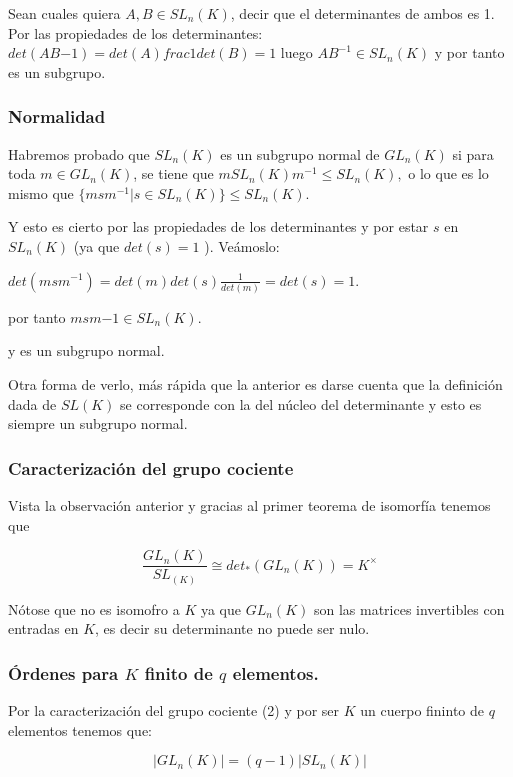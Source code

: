 \documentclass[12pt]{article}
\begin{document}
Sean cuales quiera $A,B \in SL_n(K)$, decir que el determinantes de ambos es 1. 
Por las propiedades de los determinantes: 
$det(A B{-1}) = det(A) frac{1}{det(B)} = 1$ luego  $AB^{-1} \in SL_n(K)$
y por tanto es un subgrupo. 

\subsubsection*{Normalidad}
Habremos probado que $SL_n(K)$ es un subgrupo normal de $GL_n(K)$ si para toda
$m \in GL_n(K)$, se tiene que $m SL_n(K) m^{-1} \leq SL_n(K),$ o lo que es lo mismo 
que $\{m s m^{-1} | s \in SL_n(K) \} \leq SL_n(K).$

Y esto es cierto por las propiedades de los determinantes y por
 estar $s$ en $SL_n(K)$ (ya que $det(s)=1$  ). Veámoslo: 

$det(m s m^{-1}) = det(m) det(s) \frac{1}{det(m)} = det(s) = 1.$

por tanto $msm{-1} \in SL_n(K).$

y es un subgrupo normal. 

Otra forma de verlo, más rápida que la anterior es darse cuenta 
que la definición dada de $SL(K)$ se corresponde 
con la del núcleo del determinante y esto es siempre un subgrupo normal. 

\subsubsection*{Caracterización del grupo cociente}
Vista la observación anterior y gracias al primer teorema de isomorfía tenemos que

\begin{equation}
    \frac{GL_n(K)}{SL_(K)} \cong det_*(GL_n(K)) = K^\times
\end{equation}

Nótose que no es isomofro a $K$ ya que $GL_n(K)$ son las matrices invertibles
con entradas en $K$,
es decir su determinante no puede ser nulo. 

\subsubsection*{Órdenes para $K$ finito de $q$ elementos.}

Por la caracterización del grupo cociente (2) y por ser 
$K$ un cuerpo fininto de $q$ elementos tenemos que: 

\begin{equation}
    |GL_n(K)| = (q-1) |SL_n(K)|
\end{equation}
\end{document}
